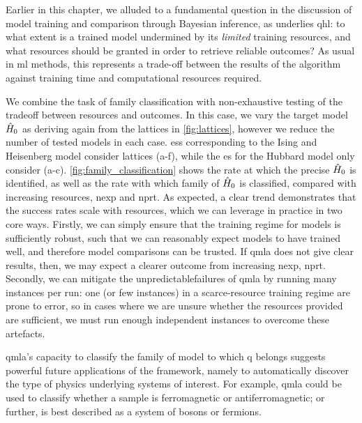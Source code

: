 Earlier in this chapter, we alluded to a fundamental question in the discussion of model training and comparison 
    through Bayesian inference, as underlies \gls{qhl}:
    to what extent is a trained model undermined by its \emph{limited} training resources\footnotemark, 
    and what resources should be granted in order to retrieve reliable outcomes?
As usual in \gls{ml} methods, this represents a trade-off between the results of the algorithm 
    against training time and computational resources required.
\par

We combine the task of family classification 
    with non-exhaustive testing of the tradeoff between resources and outcomes.
In this case, we vary the target model $\hat{H}_0$ as deriving again from the lattices in 
    \cref{fig:lattices}, 
    however we reduce the number of tested models in each case. 
\glspl{es} corresponding to the Ising and Heisenberg model consider lattices (a-f), 
    while the \gls{es} for the Hubbard model only consider (a-c). 
\cref{fig:family_classification} shows the rate at which the precise $\hat{H}_0$ is identified, 
    as well as the rate with which family of $\hat{H}_0$ is classified, 
    compared with increasing resources, \gls{nexp} and \gls{nprt}. 
As expected, a clear trend demonstrates that the success rates scale with resources,
    which we can leverage in practice in two core ways.
Firstly, we can simply ensure that the training regime for models is sufficiently robust, 
    such that we can reasonably expect models to have trained well, and therefore model comparisons can be trusted.
If \gls{qmla} does not give clear results, then, we may expect a clearer outcome from increasing \gls{nexp}, \gls{nprt}.
Secondly, we can mitigate the unpredictable\footnotemark failures of \gls{qmla} by running many \glspl{instance} per \gls{run}:
    one (or few \glspl{instance}) in a scarce-resource training regime are prone to error, 
    so in cases where we are unsure whether the resources provided are sufficient, 
    we must run enough independent \glspl{instance} to overcome these artefacts. 
\par 

\gls{qmla}'s capacity to classify the family of model to which \gls{q} belongs suggests powerful 
    future applications of the framework, namely to automatically discover the type of physics underlying 
    systems of interest.
For example, \gls{qmla} could be used to classify whether a sample is ferromagnetic or antiferromagnetic;
    or further, is best described as a system of bosons or fermions.
